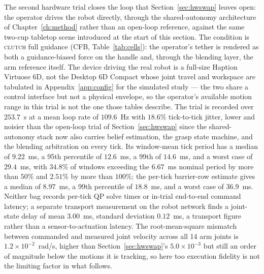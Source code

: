 The second hardware trial closes the loop that Section~\ref{sec:hwswap} leaves open: the operator drives the robot directly, through the shared-autonomy architecture of Chapter~\ref{ch:method} rather than an open-loop reference, against the same two-cup tabletop scene introduced at the start of this section. The condition is \textsc{clutch} full guidance (CFB, Table~\ref{tab:cells}): the operator's tether is rendered as both a guidance-biased force on the handle and, through the blending layer, the arm reference itself. The device driving the real robot is a full-size Haption Virtuose 6D, not the Desktop 6D Compact whose joint travel and workspace are tabulated in Appendix~\ref{app:config} for the simulated study --- the two share a control interface but not a physical envelope, so the operator's available motion range in this trial is not the one those tables describe. The trial is recorded over $253.7$~s at a mean loop rate of $109.6$~Hz with $18.6\%$ tick-to-tick jitter, lower and noisier than the open-loop trial of Section~\ref{sec:hwswap} since the shared-autonomy stack now also carries belief estimation, the grasp state machine, and the blending arbitration on every tick. Its window-mean tick period has a median of $9.22$~ms, a 95th percentile of $12.6$~ms, a 99th of $14.6$~ms, and a worst case of $29.4$~ms, with $34.8\%$ of windows exceeding the $6.67$~ms nominal period by more than $50\%$ and $2.51\%$ by more than $100\%$; the per-tick barrier-row estimate gives a median of $8.97$~ms, a 99th percentile of $18.8$~ms, and a worst case of $36.9$~ms. Neither bag records per-tick QP solve times or in-trial end-to-end command latency; a separate transport measurement on the robot network finds a joint-state delay of mean $3.00$~ms, standard deviation $0.12$~ms, a transport figure rather than a sensor-to-actuation latency. The root-mean-square mismatch between commanded and measured joint velocity across all 14 arm joints is $1.2\times10^{-2}$~rad/s, higher than Section~\ref{sec:hwswap}'s $5.0\times10^{-3}$ but still an order of magnitude below the motions it is tracking, so here too execution fidelity is not the limiting factor in what follows.

